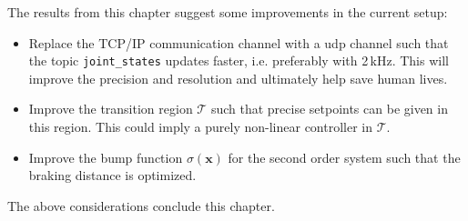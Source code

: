 The results from this chapter suggest some improvements in the current setup:
\vspace{-2mm}
\begin{itemize}
	\itemsep-0.5mm
\item Replace the TCP/IP communication channel with a \gls{udp} channel such that the topic \texttt{joint\_states} updates faster, i.e. preferably with 2\,kHz. This will  improve the precision and resolution and ultimately help save human lives.
\item Improve the transition region $\mathcal{T}$ such that precise setpoints can be given in this region. This could imply a purely non-linear controller in $\mathcal{T}$.
\item Improve the bump function $\sigma(\mathbf{x})$ for the second order system such that the braking distance is optimized.
\end{itemize}
The above considerations conclude this chapter.